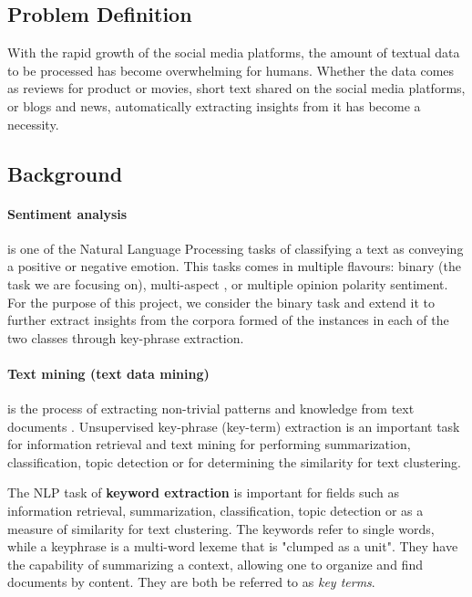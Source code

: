 \subsection{Problem Definition}
With the rapid growth of the social media platforms, the amount of textual data to be processed has become overwhelming for humans. Whether the data comes as reviews for product or movies, short text shared on the social media platforms, or blogs and news, automatically extracting insights from it has become a necessity.


\subsection{Background}

\paragraph{Sentiment analysis} is one of the Natural Language Processing tasks of classifying a text as conveying a positive or negative emotion. This tasks comes in multiple flavours: binary (the task we are focusing on), multi-aspect \cite{multiaspect}, or multiple opinion polarity sentiment. For the purpose of this project, we consider the binary task and extend it to further extract insights from the corpora formed of the instances in each of the two classes through key-phrase extraction.


\paragraph{Text mining (text data mining)} is the process of extracting non-trivial patterns and knowledge from text documents \cite{stateofartchallenge}.
Unsupervised key-phrase (key-term) extraction is an important task for information retrieval and text mining for performing summarization, classification, topic detection or for determining the similarity for text clustering. 

The NLP task of \textbf{keyword extraction} is important for fields such as information retrieval, summarization, classification, topic detection or as a measure of similarity for text clustering. 
The keywords refer to single words, while a keyphrase is a multi-word lexeme that is "clumped as a unit"\cite{manningshutze}. They have the capability of summarizing a context, allowing one to organize and find documents by content. They are both be referred to as \textit{key terms}.

